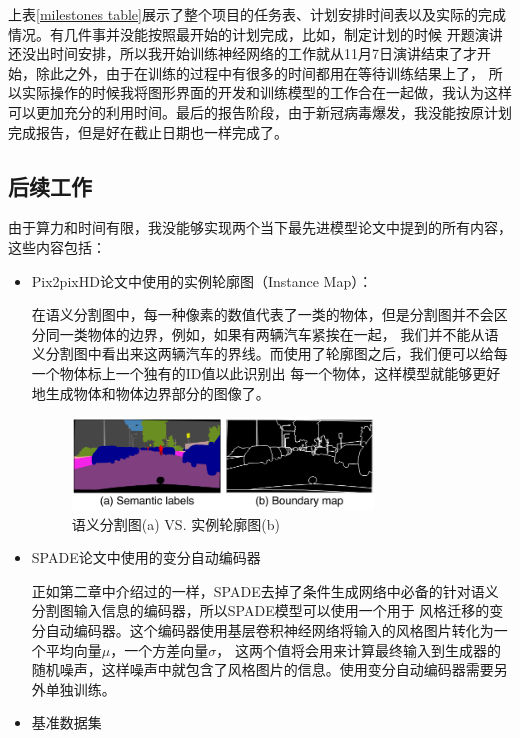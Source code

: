 \documentclass[supercite]{HustGraduPaper}
\theoremstyle{definition}
\begin{document}
上表\ref{milestones table}展示了整个项目的任务表、计划安排时间表以及实际的完成情况。有几件事并没能按照最开始的计划完成，比如，制定计划的时候
开题演讲还没出时间安排，所以我开始训练神经网络的工作就从11月7日演讲结束了才开始，除此之外，由于在训练的过程中有很多的时间都用在等待训练结果上了，
所以实际操作的时候我将图形界面的开发和训练模型的工作合在一起做，我认为这样可以更加充分的利用时间。最后的报告阶段，由于新冠病毒爆发，我没能按原计划
完成报告，但是好在截止日期也一样完成了。

\subsection{后续工作}
\label{sec:future work}

由于算力和时间有限，我没能够实现两个当下最先进模型论文中提到的所有内容，这些内容包括：
\begin{itemize}
  \item Pix2pixHD论文中使用的实例轮廓图（Instance Map）：
  
  在语义分割图中，每一种像素的数值代表了一类的物体，但是分割图并不会区分同一类物体的边界，例如，如果有两辆汽车紧挨在一起，
  我们并不能从语义分割图中看出来这两辆汽车的界线。而使用了轮廓图之后，我们便可以给每一个物体标上一个独有的ID值以此识别出
  每一个物体，这样模型就能够更好地生成物体和物体边界部分的图像了。
  \begin{figure}[H]
      \begin{center}
      \includegraphics[width=8cm]{images/instance-map}
      \end{center}
      \caption{语义分割图(a) VS. 实例轮廓图(b)}
      \label{fig:instance-map}
  \end{figure}
  \item SPADE论文中使用的变分自动编码器
  
  正如第二章中介绍过的一样，SPADE去掉了条件生成网络中必备的针对语义分割图输入信息的编码器，所以SPADE模型可以使用一个用于
  风格迁移的变分自动编码器。这个编码器使用基层卷积神经网络将输入的风格图片转化为一个平均向量$\mu$，一个方差向量$\sigma$，
  这两个值将会用来计算最终输入到生成器的随机噪声，这样噪声中就包含了风格图片的信息。使用变分自动编码器需要另外单独训练。
  \item 基准数据集
  

\end{itemize}
\end{document}
